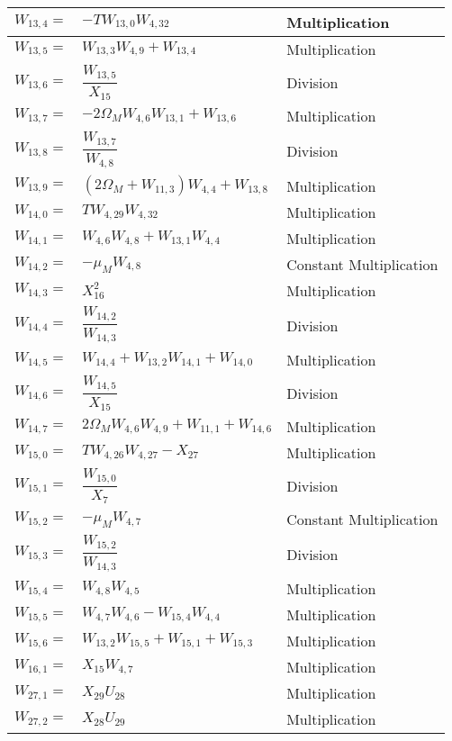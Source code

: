 \begin{longtable}{|p{1.5cm}|l|p{2cm}|}
$W_{13,4}=$ & $ -T W_{13,0} W_{4,32} $ & Multiplication \\ \hline
$W_{13,5}=$ & $ W_{13,3}W_{4,9}+W_{13,4} $ & Multiplication \\ \hline
$W_{13,6}=$ & $ \dfrac{W_{13,5}}{X_{15}} $ & Division \\ \hline
$W_{13,7}=$ & $ -2\Omega_{M}W_{4,6}W_{13,1}+W_{13,6} $ & Multiplication \\ \hline
$W_{13,8}=$ & $ \dfrac{W_{13,7}}{W_{4,8}} $ & Division \\ \hline
$W_{13,9}=$ & $ \left(2\Omega_{M}+W_{11,3} \right)W_{4,4}+W_{13,8} $ & Multiplication \\ \hline
$W_{14,0}=$ & $ T W_{4,29}W_{4,32} $ & Multiplication \\ \hline
$W_{14,1}=$ & $ W_{4,6}W_{4,8}+W_{13,1}W_{4,4} $ & Multiplication \\ \hline
$W_{14,2}=$ & $ -\mu_{M}W_{4,8} $ & Constant \mbox{Multiplication} \\ \hline
$W_{14,3}=$ & $ X_{16}^{2} $ & Multiplication \\ \hline
$W_{14,4}=$ & $ \dfrac{W_{14,2}}{W_{14,3}} $ & Division \\ \hline
$W_{14,5}=$ & $ W_{14,4}+W_{13,2}W_{14,1}+W_{14,0} $ & Multiplication \\ \hline
$W_{14,6}=$ & $ \dfrac{W_{14,5}}{X_{15}} $ & Division \\ \hline
$W_{14,7}=$ & $ 2\Omega_{M}W_{4,6}W_{4,9}+W_{11,1}+W_{14,6} $ & Multiplication \\ \hline
$W_{15,0}=$ & $ TW_{4,26}W_{4,27}-X_{27} $ & Multiplication \\ \hline
$W_{15,1}=$ & $ \dfrac{W_{15,0}}{X_{7}} $ & Division \\ \hline
$W_{15,2}=$ & $ -\mu_{M}W_{4,7} $ & Constant \mbox{Multiplication} \\ \hline
$W_{15,3}=$ & $ \dfrac{W_{15,2}}{W_{14,3}} $ & Division \\ \hline
$W_{15,4}=$ & $ W_{4,8}W_{4,5} $ & Multiplication \\ \hline
$W_{15,5}=$ & $ W_{4,7}W_{4,6}-W_{15,4}W_{4,4} $ & Multiplication \\ \hline
$W_{15,6}=$ & $ W_{13,2}W_{15,5}+W_{15,1}+W_{15,3} $ & Multiplication \\ \hline
$W_{16,1}=$ & $ X_{15}W_{4,7} $ & Multiplication \\ \hline
$W_{27,1}=$ & $ X_{29}U_{28} $ & Multiplication \\ \hline
$W_{27,2}=$ & $ X_{28}U_{29} $ & Multiplication \\ \hline

\end{longtable}
